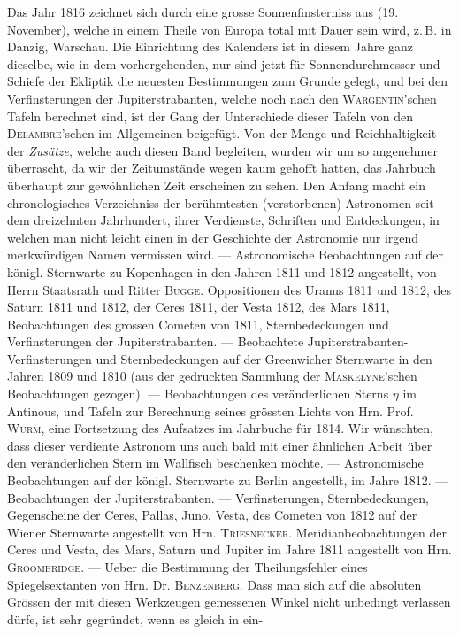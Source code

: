 Das Jahr 1816 zeichnet sich durch eine grosse Sonnenfinsterniss aus (19. November), welche in einem Theile von Europa total mit Dauer sein wird, z.\,B. in Danzig, Warschau. Die Einrichtung des Kalenders ist in diesem Jahre ganz dieselbe, wie in dem vorhergehenden, nur sind jetzt für Sonnendurchmesser und Schiefe der Ekliptik die neuesten Bestimmungen zum Grunde gelegt, und bei den Verfinsterungen der Jupiterstrabanten, welche noch nach den \textsc{Wargentin}'schen Tafeln berechnet sind, ist der Gang der Unterschiede dieser Tafeln von den \textsc{Delambre}'schen im Allgemeinen beigefügt. Von der Menge und Reichhaltigkeit der \emph{Zusätze}, welche auch diesen Band begleiten, wurden wir um so angenehmer überrascht, da wir der Zeitumstände wegen kaum gehofft hatten, das Jahrbuch überhaupt zur gewöhnlichen Zeit erscheinen zu sehen. Den Anfang macht ein chronologisches Verzeichniss der berühmtesten (verstorbenen) Astronomen seit dem dreizehnten Jahrhundert, ihrer Verdienste, Schriften und Entdeckungen, in welchen man nicht leicht einen in der Geschichte der Astronomie nur irgend merkwürdigen Namen vermissen wird. — Astronomische Beobachtungen auf der königl. Sternwarte zu Kopenhagen in den Jahren 1811 und 1812 angestellt, von Herrn Staatsrath und Ritter \textsc{Bugge}. Oppositionen des Uranus 1811 und 1812, des Saturn 1811 und 1812, der Ceres 1811, der Vesta 1812, des Mars 1811, Beobachtungen des grossen Cometen von 1811, Sternbedeckungen und Verfinsterungen der Jupiterstrabanten. — Beobachtete Jupiterstrabanten-Verfinsterungen und Sternbedeckungen auf der Greenwicher Sternwarte in den Jahren 1809 und 1810 (aus der gedruckten Sammlung der \textsc{Maskelyne}'schen Beobachtungen gezogen). — Beobachtungen des veränderlichen Sterns $\eta$ im Antinous, und Tafeln zur Berechnung seines grössten Lichts von Hrn. Prof. \textsc{Wurm}, eine Fortsetzung des Aufsatzes im Jahrbuche für 1814. Wir wünschten, dass dieser verdiente Astronom uns auch bald mit einer ähnlichen Arbeit über den veränderlichen Stern im Wallfisch beschenken möchte. — Astronomische Beobachtungen auf der königl. Sternwarte zu Berlin angestellt, im Jahre 1812. — Beobachtungen der Jupiterstrabanten. — Verfinsterungen, Sternbedeckungen, Gegenscheine der Ceres, Pallas, Juno, Vesta, des Cometen von 1812 auf der Wiener Sternwarte angestellt von Hrn. \textsc{Triesnecker}. Meridianbeobachtungen der Ceres und Vesta, des Mars, Saturn und Jupiter im Jahre 1811 angestellt von Hrn. \textsc{Groombridge}. — Ueber die Bestimmung der Theilungsfehler eines Spiegelsextanten von Hrn. Dr. \textsc{Benzenberg}. Dass man sich auf die absoluten Grössen der mit diesen Werkzeugen gemessenen Winkel nicht unbedingt verlassen dürfe, ist sehr gegründet, wenn es gleich in ein-\par
